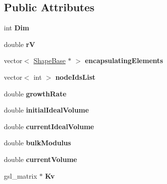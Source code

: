 \subsection*{Public Attributes}
\begin{DoxyCompactItemize}
\item 
\hypertarget{classLumen_a2ac064313880e26bdb1a863fe3e1db0a}{}int {\bfseries Dim}\label{classLumen_a2ac064313880e26bdb1a863fe3e1db0a}

\item 
\hypertarget{classLumen_a2917eff7e386462674fc88352090a537}{}double {\bfseries r\+V}\label{classLumen_a2917eff7e386462674fc88352090a537}

\item 
\hypertarget{classLumen_a7346bd22bf12a5f9d52cc15ceb15931c}{}vector$<$ \hyperlink{classShapeBase}{Shape\+Base} $\ast$ $>$ {\bfseries encapsulating\+Elements}\label{classLumen_a7346bd22bf12a5f9d52cc15ceb15931c}

\item 
\hypertarget{classLumen_accccacf72e39440a6b0f2bf145ddff83}{}vector$<$ int $>$ {\bfseries node\+Ids\+List}\label{classLumen_accccacf72e39440a6b0f2bf145ddff83}

\item 
\hypertarget{classLumen_a098cd0bc359d34adb0e87aa71fe11c90}{}double {\bfseries growth\+Rate}\label{classLumen_a098cd0bc359d34adb0e87aa71fe11c90}

\item 
\hypertarget{classLumen_af4f3206c44cbf403fcdd8c2fe111e54d}{}double {\bfseries initial\+Ideal\+Volume}\label{classLumen_af4f3206c44cbf403fcdd8c2fe111e54d}

\item 
\hypertarget{classLumen_a22e3c941e1c76c65fef454a61dd4cff4}{}double {\bfseries current\+Ideal\+Volume}\label{classLumen_a22e3c941e1c76c65fef454a61dd4cff4}

\item 
\hypertarget{classLumen_accffa09db00c0d30da8456b8b5254f4a}{}double {\bfseries bulk\+Modulus}\label{classLumen_accffa09db00c0d30da8456b8b5254f4a}

\item 
\hypertarget{classLumen_a110a7146fb30c9eeb85f99085ecde6d9}{}double {\bfseries current\+Volume}\label{classLumen_a110a7146fb30c9eeb85f99085ecde6d9}

\item 
\hypertarget{classLumen_a17007acb891977edc971749b09ce975f}{}gsl\+\_\+matrix $\ast$ {\bfseries Kv}\label{classLumen_a17007acb891977edc971749b09ce975f}


\end{DoxyCompactItemize}
